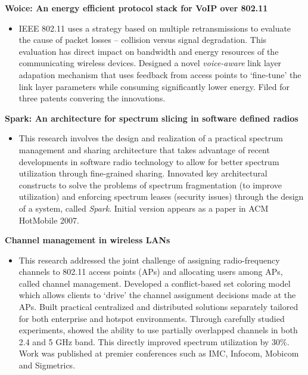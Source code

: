 \begin{resume}
{\bf Woice: An energy efficient protocol stack for VoIP over 802.11}
    \begin{itemize}
	\item [] IEEE 802.11 uses a strategy based on multiple retransmissions  to evaluate the cause of packet losses
-- collision versus signal degradation. This evaluation has direct impact on
bandwidth and energy resources of the communicating wireless devices. Designed
a novel {\it voice-aware} link layer
adapation mechanism that uses feedback from access points to `fine-tune' the
link layer parameters while consuming significantly
lower energy.  Filed for three patents convering the innovations.
\end{itemize}
\vspace{-0.2cm}

{\bf Spark: An architecture for spectrum slicing in software defined radios}
 \begin{itemize}
 \item [] This research
involves the design and realization of a practical spectrum management and sharing architecture that takes advantage of
recent developments in software radio technology to allow for better spectrum utilization through fine-grained sharing.
Innovated key architectural constructs to solve the problems of spectrum fragmentation (to improve utilization) and
enforcing spectrum leases (security issues) through the design of a system, called {\it Spark}. Initial version appears
as a paper in ACM HotMobile 2007.
 \end{itemize}

{\bf Channel management in wireless LANs}
    \begin{itemize}
	\item [] This research addressed the joint challenge of assigning
	radio-frequency channels to 802.11 access points (APs) and allocating
	users among APs, called channel management. Developed a conflict-based set coloring model which allows clients to `drive' the channel assignment
decisions made at the APs.  Built practical centralized and distributed solutions separately tailored for both enterprise and hotspot
environments. Through carefully studied experiments, showed the ability to use partially overlapped channels in both 2.4
and 5 GHz band. This directly improved spectrum utilization by 30\%.  Work was published at premier conferences such as
IMC, Infocom, Mobicom and Sigmetrics.
    \end{itemize}
\vspace{-0.2cm}


\end{resume}
